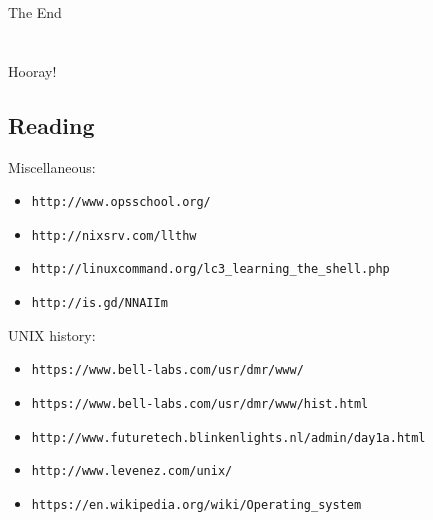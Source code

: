 \documentclass[xga]{xdvislides}
\begin{document}
%
%
%
%
\newpage
\vspace*{\fill}
\begin{center}
    \Hugesize
        The End \\ [1em]
    \hspace*{5mm}
    \blueline\\
    \hspace*{5mm}\\
        Hooray!
\end{center}
\vspace*{\fill}

\subsection{Reading}
Miscellaneous:
\begin{itemize}
	\item \verb+http://www.opsschool.org/+
	\item \verb+http://nixsrv.com/llthw+
	\item \verb+http://linuxcommand.org/lc3_learning_the_shell.php+
	\item \verb+http://is.gd/NNAIIm+
\end{itemize}

UNIX history:
\begin{itemize}
	\item \verb+https://www.bell-labs.com/usr/dmr/www/+
	\item \verb+https://www.bell-labs.com/usr/dmr/www/hist.html+
	\item \verb+http://www.futuretech.blinkenlights.nl/admin/day1a.html+
	\item \verb+http://www.levenez.com/unix/+
	\item \verb+https://en.wikipedia.org/wiki/Operating_system+
\end{itemize}
\end{document}

